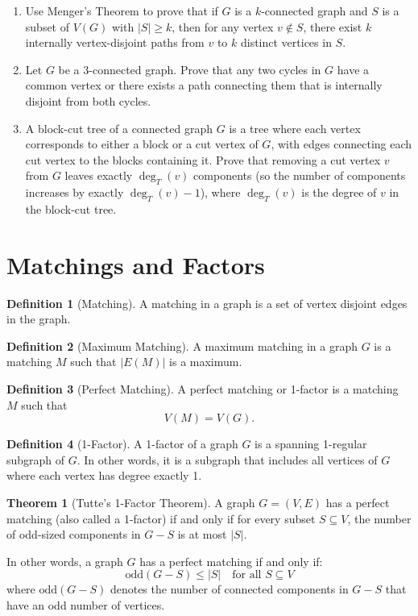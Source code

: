 \documentclass{article}
\theoremstyle{definition}
\newtheorem{theorem}{Theorem}
\newtheorem{definition}{Definition}
\begin{document}
\begin{enumerate}
\item Use Menger's Theorem to prove that if $G$ is a $k$-connected graph and $S$ is a subset of $V(G)$ with $|S| \geq k$, then for any vertex $v \not\in S$, there exist $k$ internally vertex-disjoint paths from $v$ to $k$ distinct vertices in $S$.

\item Let $G$ be a $3$-connected graph. Prove that any two cycles in $G$ have a common vertex or there exists a path connecting them that is internally disjoint from both cycles.

\item A block-cut tree of a connected graph $G$ is a tree where each vertex corresponds to either a block or a cut vertex of $G$, with edges connecting each cut vertex to the blocks containing it. Prove that removing a cut vertex $v$ from $G$ leaves exactly $\deg_T(v)$ components (so the number of components increases by exactly $\deg_T(v) - 1$), where $\deg_T(v)$ is the degree of $v$ in the block-cut tree.
\end{enumerate}
\pagebreak
\newpage

\section{Matchings and Factors}\label{sec:matchings}

\begin{definition}[Matching]
A matching in a graph is a set of vertex disjoint edges in the graph.
\end{definition}

\begin{definition}[Maximum Matching]
A maximum matching in a graph $G$ is a matching $M$ such that $|E(M)|$ is a maximum.
\end{definition}

\begin{definition}[Perfect Matching]
 A perfect matching or 1-factor is a matching $M$ such that 
\[V(M) = V(G).\]
\end{definition}


\begin{definition}[1-Factor]
A 1-factor of a graph $G$ is a spanning 1-regular subgraph of $G$. In other words, it is a subgraph that includes all vertices of $G$ where each vertex has degree exactly 1.
\end{definition}

\begin{theorem}[Tutte's 1-Factor Theorem]
A graph $G = (V, E)$ has a perfect matching (also called a 1-factor) if and only if for every subset $S \subseteq V$, the number of odd-sized components in $G - S$ is at most $|S|$.

In other words, a graph $G$ has a perfect matching if and only if:
\[
\text{odd}(G - S) \leq |S| \quad \text{for all } S \subseteq V
\]
where $\text{odd}(G - S)$ denotes the number of connected components in $G - S$ that have an odd number of vertices.
\end{theorem}
\end{document}
